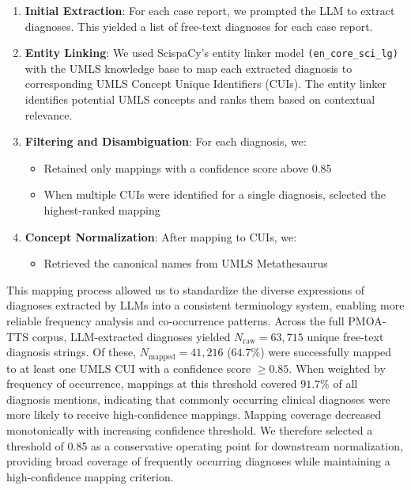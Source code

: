 \documentclass[pdflatex,sn-mathphys-num]{sn-jnl}%
\theoremstyle{thmstyleone}%
\theoremstyle{thmstyletwo}%
\theoremstyle{thmstylethree}%
\begin{document}
\begin{enumerate}
    \item \textbf{Initial Extraction}: For each case report, we prompted the LLM to extract diagnoses. 
    This yielded a list of free-text diagnoses for each case report.
    \item \textbf{Entity Linking}: We used ScispaCy's entity linker model 
    \texttt{(en\_core\_sci\_lg)} with the UMLS knowledge base to map each extracted diagnosis to corresponding UMLS Concept Unique Identifiers (CUIs). 
    The entity linker identifies potential UMLS concepts and ranks them based on contextual relevance.
    \item \textbf{Filtering and Disambiguation}: For each diagnosis, we:
    \begin{itemize}
       \item Retained only mappings with a confidence score above 0.85
       \item When multiple CUIs were identified for a single diagnosis, selected the highest-ranked mapping
    \end{itemize}
    \item \textbf{Concept Normalization}: After mapping to CUIs, we:
\begin{itemize}
   \item Retrieved the canonical names from UMLS Metathesaurus
\end{itemize}
\end{enumerate}



This mapping process allowed us to standardize the diverse expressions of diagnoses extracted by LLMs into a consistent terminology system, enabling more reliable frequency analysis and co-occurrence patterns. 
Across the full PMOA-TTS corpus, LLM-extracted diagnoses yielded
$N_{\text{raw}} = 63{,}715$ unique free-text diagnosis strings.
Of these, $N_{\text{mapped}} = 41{,}216$ ($64.7\%$) were successfully mapped to at least one
UMLS CUI with a confidence score $\ge 0.85$.
When weighted by frequency of occurrence, mappings at this threshold covered
$91.7\%$ of all diagnosis mentions, indicating that commonly occurring clinical
diagnoses were more likely to receive high-confidence mappings.
Mapping coverage decreased monotonically with increasing confidence threshold.
We therefore selected a threshold of 0.85 as a conservative operating point for
downstream normalization, providing broad coverage of frequently occurring diagnoses
while maintaining a high-confidence mapping criterion.
\end{document}
